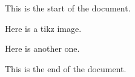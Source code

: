 




    This is the start of the document.

    Here is a tikz image.

    Here is another one.
    

    This is the end of the document.

